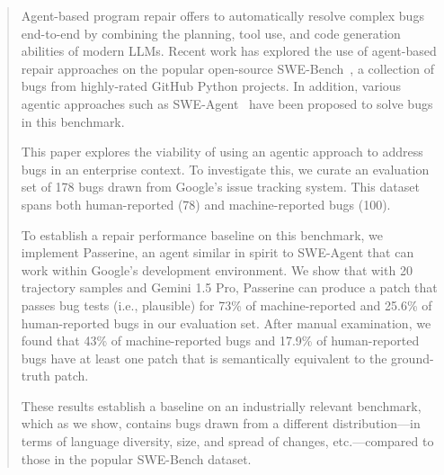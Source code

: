 \begin{abstract}
Agent-based program repair offers to
automatically resolve complex bugs end-to-end by
combining the planning, tool use, and code generation
abilities of modern LLMs. Recent work has explored
the use of agent-based repair approaches on 
the popular open-source SWE-Bench~\cite{swebench}, a collection of bugs from highly-rated GitHub Python projects.
In addition, various agentic approaches such as SWE-Agent~\cite{sweagent} have been proposed to solve bugs in this benchmark.

This paper explores the viability of using an agentic approach to address bugs in an enterprise context. 
To investigate this, we curate
an evaluation set of 178 bugs drawn from
Google's issue tracking system. This dataset
spans both human-reported (78) and machine-reported bugs (100).

To establish a repair performance baseline on this benchmark, we implement Passerine, an agent similar in spirit to SWE-Agent that can work within Google's development 
environment.  We show that with 20 trajectory samples and Gemini 1.5 Pro,
Passerine can produce a patch that passes bug tests (i.e., plausible) for 
73\% of machine-reported and 25.6\% of human-reported bugs 
in our evaluation set. 
After manual examination, we found that 43\% of machine-reported bugs and 17.9\% of human-reported bugs have at least one patch that is semantically equivalent to the ground-truth patch.

These results establish a baseline on an industrially
relevant benchmark, which as we show,
contains bugs drawn from
a different distribution---in terms of language diversity, size, and spread of changes, etc.---compared to those
in the popular SWE-Bench dataset.









\end{abstract}
